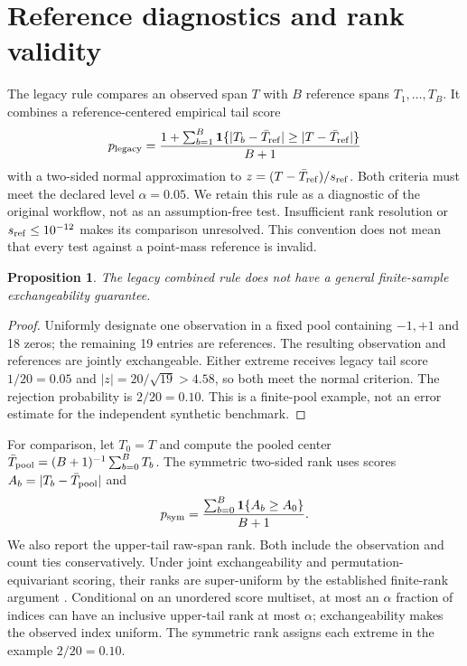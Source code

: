 \documentclass[10pt,twocolumn]{article}
\newtheorem{proposition}{Proposition}
\begin{document}
\section{Reference diagnostics and rank validity}
The legacy rule compares an observed span $T$ with $B$ reference spans
$T_1,\ldots,T_B$. It combines a reference-centered empirical tail score
\begin{equation}
p_{\rm legacy}=\frac{1+\sum_{b=1}^B
\mathbf{1}\{|T_b-\bar T_{\rm ref}|\geq|T-\bar T_{\rm ref}|\}}{B+1}
\label{eq:legacy}
\end{equation}
with a two-sided normal approximation to
$z=(T-\bar T_{\rm ref})/s_{\rm ref}$. Both criteria must meet the declared
level $\alpha=0.05$. We retain this rule as a diagnostic of the original
workflow, not as an assumption-free test. Insufficient rank resolution or
$s_{\rm ref}\leq10^{-12}$ makes its comparison unresolved. This convention
does not mean that every test against a point-mass reference is invalid.

\begin{proposition}
The legacy combined rule does not have a general finite-sample
exchangeability guarantee.
\end{proposition}
\begin{proof}
Uniformly designate one observation in a fixed pool containing $-1,+1$ and
18 zeros; the remaining 19 entries are references. The resulting observation
and references are jointly exchangeable. Either extreme receives legacy tail
score $1/20=0.05$ and $|z|=20/\sqrt{19}>4.58$, so both meet the normal
criterion. The rejection probability is $2/20=0.10$. This is a finite-pool
example, not an error estimate for the independent synthetic benchmark.
\end{proof}

For comparison, let $T_0=T$ and compute the pooled center
$\bar T_{\rm pool}=(B+1)^{-1}\sum_{b=0}^{B}T_b$. The symmetric two-sided
rank uses scores $A_b=|T_b-\bar T_{\rm pool}|$ and
\begin{equation}
p_{\rm sym}=\frac{\sum_{b=0}^{B}\mathbf{1}\{A_b\geq A_0\}}{B+1}.
\label{eq:symmetric}
\end{equation}
We also report the upper-tail raw-span rank. Both include the observation and
count ties conservatively. Under joint exchangeability and permutation-equivariant
scoring, their ranks are super-uniform by the established finite-rank argument
\citep{kuchibhotla2020,hemerik2018}. Conditional on an unordered score multiset,
at most an $\alpha$ fraction of indices can have an inclusive upper-tail rank
at most $\alpha$; exchangeability makes the observed index uniform.
The symmetric rank assigns each extreme in the example $2/20=0.10$.
\end{document}
